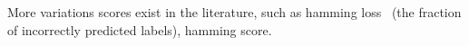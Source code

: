 More variations scores exist in the literature, such as hamming loss~\cite{hammingLoss} (the fraction of incorrectly predicted labels), hamming score.





